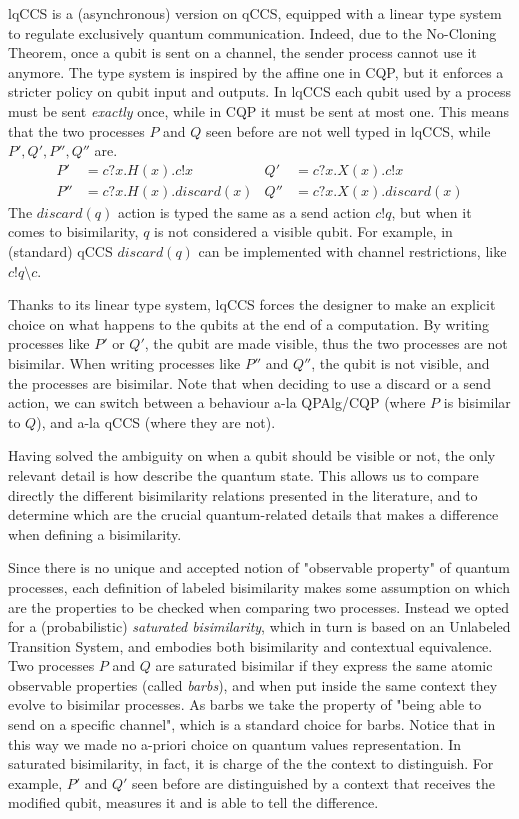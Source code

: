 lqCCS is a (asynchronous) version on qCCS, equipped with a linear type system to regulate exclusively quantum communication. Indeed, due to the No-Cloning Theorem, once a qubit is sent on a channel, the sender process cannot use it anymore. The type system is inspired by the affine one in CQP, but it enforces a stricter policy on qubit input and outputs. In lqCCS each qubit used by a process must be sent \textit{exactly} once, while in CQP it must be sent at most one. This means that the two processes $P$ and $Q$ seen before are not well typed in lqCCS, while $P', Q', P'', Q''$ are.
\begin{align*}
P' &= c?x.H(x).c!x &  Q' &= c?x.X(x).c!x \\
P'' &= c?x.H(x).discard(x) &  Q'' &= c?x.X(x).discard(x)
\end{align*}
The $discard(q)$ action is typed the same as a send action $c!q$, but when it comes to bisimilarity, $q$ is not considered a visible qubit. For example, in (standard) qCCS $discard(q)$ can be implemented with channel restrictions, like $c!q\setminus c$.

Thanks to its linear type system, lqCCS forces the designer to make an explicit choice on what happens to the qubits at the end of a computation. By writing processes like $P'$ or $Q'$, the qubit are made visible, thus the two processes are not bisimilar. When writing processes like $P''$ and $Q''$, the qubit is not visible, and the processes are bisimilar. Note that when deciding to use a discard or a send action, we can switch between a behaviour a-la QPAlg/CQP (where $P$ is bisimilar to $Q$), and a-la qCCS (where they are not).

Having solved the ambiguity on when a qubit should be visible or not, the only relevant detail is how describe the quantum state. This allows us to compare directly the different bisimilarity relations presented in the literature, and to determine which are the crucial  quantum-related details that makes a difference when defining a bisimilarity.  

Since there  is no unique and accepted notion of "observable property" of quantum processes, each definition of labeled bisimilarity makes some assumption on which are the properties to be checked when comparing two processes. Instead we opted for a (probabilistic) \textit{saturated bisimilarity}, which in turn is based on an Unlabeled Transition System, and embodies both bisimilarity and contextual equivalence. Two processes $P$ and $Q$ are saturated bisimilar if they express the same atomic observable properties (called \textit{barbs}), and when put inside the same context they evolve to bisimilar processes. As barbs we take the property of "being able to send on a specific channel", which  is a standard choice for barbs. Notice that in this way we made no a-priori choice on quantum values representation. In saturated bisimilarity, in fact, it is charge of the the context to distinguish. For example, $P'$ and $Q'$ seen before are distinguished by a context that receives the modified qubit, measures it and is able to tell the difference.

